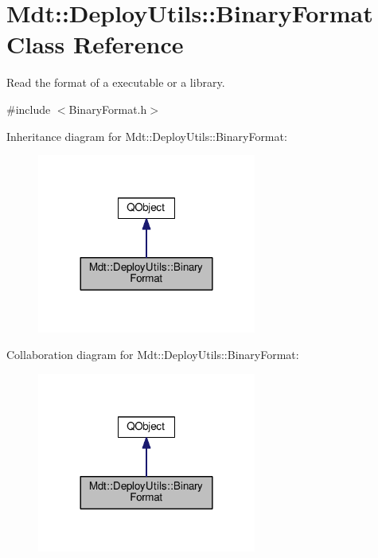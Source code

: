\hypertarget{class_mdt_1_1_deploy_utils_1_1_binary_format}{}\section{Mdt\+:\+:Deploy\+Utils\+:\+:Binary\+Format Class Reference}
\label{class_mdt_1_1_deploy_utils_1_1_binary_format}


Read the format of a executable or a library.  




{\ttfamily \#include $<$Binary\+Format.\+h$>$}



Inheritance diagram for Mdt\+:\+:Deploy\+Utils\+:\+:Binary\+Format\+:
\nopagebreak
\begin{figure}[H]
\begin{center}
\leavevmode
\includegraphics[width=204pt]{class_mdt_1_1_deploy_utils_1_1_binary_format__inherit__graph}
\end{center}
\end{figure}


Collaboration diagram for Mdt\+:\+:Deploy\+Utils\+:\+:Binary\+Format\+:
\nopagebreak
\begin{figure}[H]
\begin{center}
\leavevmode
\includegraphics[width=204pt]{class_mdt_1_1_deploy_utils_1_1_binary_format__coll__graph}
\end{center}
\end{figure}
